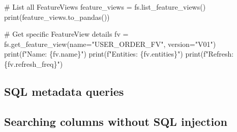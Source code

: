 \documentclass[
  letterpaper,
  DIV=11,
  numbers=noendperiod]{scrreprt}
\newenvironment{Shaded}{\begin{snugshade}}{\end{snugshade}}
\newcommand{\BuiltInTok}[1]{\textcolor[rgb]{0.00,0.23,0.31}{#1}}
\newcommand{\CommentTok}[1]{\textcolor[rgb]{0.37,0.37,0.37}{#1}}
\newcommand{\KeywordTok}[1]{\textcolor[rgb]{0.00,0.23,0.31}{#1}}
\newcommand{\NormalTok}[1]{\textcolor[rgb]{0.00,0.23,0.31}{#1}}
\newcommand{\OperatorTok}[1]{\textcolor[rgb]{0.37,0.37,0.37}{#1}}
\newcommand{\SpecialCharTok}[1]{\textcolor[rgb]{0.37,0.37,0.37}{#1}}
\newcommand{\SpecialStringTok}[1]{\textcolor[rgb]{0.13,0.47,0.30}{#1}}
\newcommand{\StringTok}[1]{\textcolor[rgb]{0.13,0.47,0.30}{#1}}
\begin{document}
\begin{Shaded}
\begin{Highlighting}[]
\CommentTok{\# List all FeatureViews}
\NormalTok{feature\_views }\OperatorTok{=}\NormalTok{ fs.list\_feature\_views()}
\BuiltInTok{print}\NormalTok{(feature\_views.to\_pandas())}

\CommentTok{\# Get specific FeatureView details}
\NormalTok{fv }\OperatorTok{=}\NormalTok{ fs.get\_feature\_view(name}\OperatorTok{=}\StringTok{"USER\_ORDER\_FV"}\NormalTok{, version}\OperatorTok{=}\StringTok{"V01"}\NormalTok{)}
\BuiltInTok{print}\NormalTok{(}\SpecialStringTok{f"Name: }\SpecialCharTok{\{}\NormalTok{fv}\SpecialCharTok{.}\NormalTok{name}\SpecialCharTok{\}}\SpecialStringTok{"}\NormalTok{)}
\BuiltInTok{print}\NormalTok{(}\SpecialStringTok{f"Entities: }\SpecialCharTok{\{}\NormalTok{fv}\SpecialCharTok{.}\NormalTok{entities}\SpecialCharTok{\}}\SpecialStringTok{"}\NormalTok{)}
\BuiltInTok{print}\NormalTok{(}\SpecialStringTok{f"Refresh: }\SpecialCharTok{\{}\NormalTok{fv}\SpecialCharTok{.}\NormalTok{refresh\_freq}\SpecialCharTok{\}}\SpecialStringTok{"}\NormalTok{)}
\end{Highlighting}
\end{Shaded}

\hypertarget{sql-metadata-queries}{%
\subsection{SQL metadata queries}\label{sql-metadata-queries}}

\begin{Shaded}
\end{Shaded}

\hypertarget{searching-columns-without-sql-injection}{%
\subsection{Searching columns without SQL
injection}\label{searching-columns-without-sql-injection}}
\end{document}
